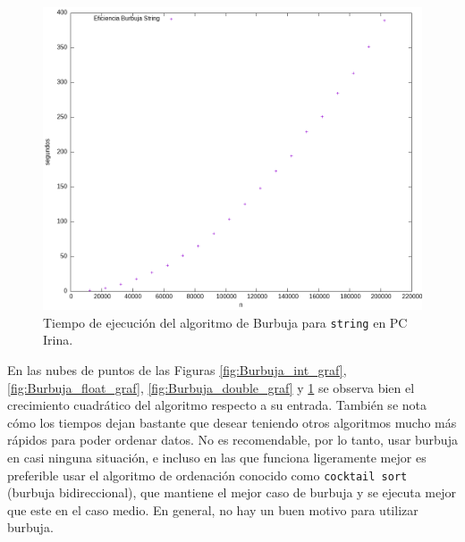 \documentclass[12pt]{article}
\begin{document}
    \begin{figure}
        \centering
        \includegraphics[width=0.8\linewidth]{images/Burbuja/graficos/str.png}
        \cprotect\caption{Tiempo de ejecución del algoritmo de Burbuja para \verb|string| en PC Irina.}
        \label{fig:Burbuja_string_graf}
    \end{figure}

    En las nubes de puntos de las Figuras \ref{fig:Burbuja_int_graf}, \ref{fig:Burbuja_float_graf}, \ref{fig:Burbuja_double_graf} y \ref{fig:Burbuja_string_graf} se observa bien el crecimiento cuadrático del algoritmo respecto a su entrada. También se nota cómo los tiempos dejan bastante que desear teniendo otros algoritmos mucho más rápidos para poder ordenar datos. No es recomendable, por lo tanto, usar burbuja en casi ninguna situación, e incluso en las que funciona ligeramente mejor es preferible usar el algoritmo de ordenación conocido como \verb|cocktail sort| (burbuja bidireccional), que mantiene el mejor caso de burbuja y se ejecuta mejor que este en el caso medio. En general, no hay un buen motivo para utilizar burbuja.
    
\end{document}
